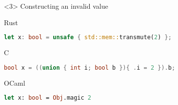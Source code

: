 \begin{frame}[fragile, t]
    \begin{onlyenv}<3>
        Constructing an invalid value
        \begin{block}{Rust}
            \begin{lstlisting}[language=rust]
let x: bool = unsafe { std::mem::transmute(2) };
            \end{lstlisting}
        \end{block}

        \begin{block}{C}
            \begin{lstlisting}[language=c]
bool x = ((union { int i; bool b }){ .i = 2 }).b;
            \end{lstlisting}
        \end{block}

        \begin{block}{OCaml}
            \begin{lstlisting}[language=ml]
let x: bool = Obj.magic 2
            \end{lstlisting}
        \end{block}
    \end{onlyenv}
\end{frame}


